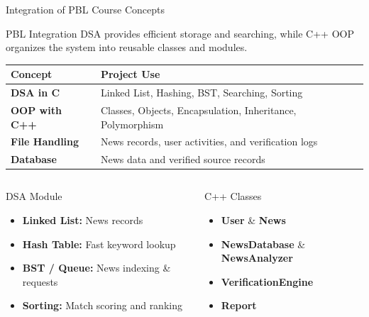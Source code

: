 \documentclass[aspectratio=169,10pt]{beamer}
\def\tightlistspacing{%
  \setlength{\itemsep}{1.2pt}%
  \setlength{\parsep}{0pt}%
  \setlength{\topsep}{1pt}%
  \setlength{\partopsep}{0pt}%
}
\begin{document}
\begin{frame}{Integration of PBL Course Concepts}
\begin{block}{PBL Integration}
\scriptsize\RaggedRight
DSA provides efficient storage and searching, while C++ OOP organizes the system into reusable classes and modules.
\end{block}

\vspace{1.5mm}
\begin{center}
\renewcommand{\arraystretch}{1.1}
\scriptsize
\begin{tabularx}{\textwidth}{@{}>{\bfseries\RaggedRight}p{2.3cm}>{\RaggedRight}X@{}}
\toprule
Concept & Project Use\\
\midrule
DSA in C & Linked List, Hashing, BST, Searching, Sorting\\
OOP with C++ & Classes, Objects, Encapsulation, Inheritance, Polymorphism\\
File Handling & News records, user activities, and verification logs\\
Database & News data and verified source records\\
\bottomrule
\end{tabularx}
\end{center}

\vspace{1.5mm}
\begin{columns}[T,totalwidth=\textwidth]
\begin{block}{DSA Module}
\begin{itemize}\scriptsize\tightlistspacing
\item \textbf{Linked List:} News records
\item \textbf{Hash Table:} Fast keyword lookup
\item \textbf{BST / Queue:} News indexing \& requests
\item \textbf{Sorting:} Match scoring and ranking
\end{itemize}
\end{block}

\begin{block}{C++ Classes}
\begin{itemize}\scriptsize\tightlistspacing
\item \textbf{User} \& \textbf{News}
\item \textbf{NewsDatabase} \& \textbf{NewsAnalyzer}
\item \textbf{VerificationEngine}
\item \textbf{Report}
\end{itemize}
\end{block}
\end{columns}
\end{frame}
\end{document}
